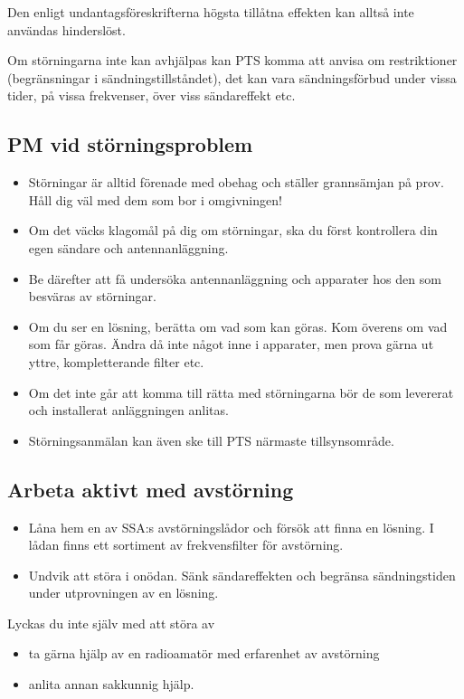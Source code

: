 Den enligt undantagsföreskrifterna högsta tillåtna effekten kan alltså inte
användas hinderslöst.

Om störningarna inte kan avhjälpas kan PTS komma att anvisa om restriktioner
(begränsningar i sändningstillståndet), det kan vara sändningsförbud under
vissa tider, på vissa frekvenser, över viss sändareffekt etc.

\subsection{PM vid störningsproblem}
\begin{itemize}
\item Störningar är alltid förenade med obehag och ställer grannsämjan på prov.
  Håll dig väl med dem som bor i omgivningen!
\item Om det väcks klagomål på dig om störningar, ska du först
  kontrollera din egen sändare och antennanläggning.
\item Be därefter att få undersöka antennanläggning och apparater hos
  den som besväras av störningar.
\item Om du ser en lösning, berätta om vad som kan göras.
  Kom överens om vad som får göras.
  Ändra då inte något inne i apparater, men prova gärna ut yttre,
  kompletterande filter etc.
\item Om det inte går att komma till rätta med störningarna bör de som
  levererat och installerat anläggningen anlitas.
\item Störningsanmälan kan även ske till PTS närmaste tillsynsområde.
\end{itemize}

\subsection{Arbeta aktivt med avstörning}
\begin{itemize}
\item Låna hem en av SSA:s avstörningslådor och försök att finna en lösning.
  I lådan finns ett sortiment av frekvensfilter för avstörning.
\item Undvik att störa i onödan.
  Sänk sändareffekten och begränsa sändningstiden under utprovningen av en
  lösning.
\end{itemize}

Lyckas du inte själv med att störa av
\begin{itemize}
\item ta gärna hjälp av en radioamatör med erfarenhet av avstörning
\item anlita annan sakkunnig hjälp.
\end{itemize}
